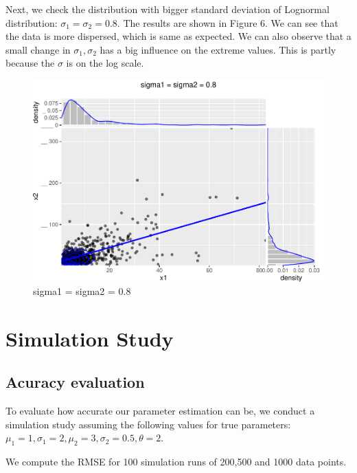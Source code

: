 \documentclass[11pt,]{article}
\begin{document}
Next, we check the distribution with bigger standard deviation of
Lognormal distribution: \(\sigma_1 =\sigma_2 = 0.8\). The results are
shown in Figure 6. We can see that the data is more dispersed, which is
same as expected. We can also observe that a small change in
\(\sigma_1, \sigma_2\) has a big influence on the extreme values. This
is partly because the \(\sigma\) is on the log scale.

\begin{figure}
\centering
\includegraphics{figs/unnamed-chunk-10.pdf}
\caption{sigma1 = sigma2 = 0.8}
\end{figure}

\hypertarget{simulation-study}{%
\section{Simulation Study}\label{simulation-study}}

\hypertarget{acuracy-evaluation}{%
\subsection{Acuracy evaluation}\label{acuracy-evaluation}}

To evaluate how accurate our parameter estimation can be, we conduct a
simulation study assuming the following values for true parameters:
\(\mu_1=1,\sigma_1=2,\mu_2=3,\sigma_2=0.5,\theta=2\).

We compute the RMSE for 100 simulation runs of 200,500 and 1000 data
points.
\end{document}
